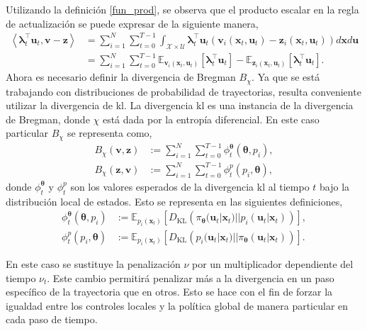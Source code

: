 Utilizando la definición \ref{fun_prod}, se observa que el producto escalar en la regla de actualización se puede expresar de la siguiente manera,
\begin{equation}
\begin{aligned}
    \left\langle\bm\lambda^{\top}_t\mathbf{u}_t, \mathbf{v}-\mathbf{z}\right\rangle &= \sum_{i=1}^{N}\sum_{t=0}^{T-1}\int_{\mathcal{X}\times\mathcal{U}}\bm\lambda_{t}^{\top}\mathbf{u}_t \left(\mathbf{v}_{i}(\mathbf{x}_t, \mathbf{u}_t)-\mathbf{z}_{i}(\mathbf{x}_t, \mathbf{u}_t)\right)d\mathbf{x}d\mathbf{u} \\
    &= \sum_{i=1}^{N}\sum_{t=0}^{T-1}\mathbb{E}_{\mathbf{v}_i(\mathbf{x}_t, \mathbf{u}_t)}\left[\bm\lambda_{t}^{\top}\mathbf{u}_t\right] - \mathbb{E}_{\mathbf{z}_i(\mathbf{x}_t, \mathbf{u}_t)}\left[\bm\lambda_{t}^{\top}\mathbf{u}_t\right].
\end{aligned}
\end{equation}
Ahora es necesario definir la divergencia de Bregman $B_{\chi}$. Ya que se está trabajando con 
distribuciones de probabilidad de trayectorias, resulta conveniente utilizar la divergencia de \acrfull{kl}. La divergencia \acrshort{kl} es una instancia de la divergencia de Bregman, donde $\chi$ está dada por la entropía diferencial. En este caso particular $B_{\chi}$ se representa como, 
\begin{align}
    B_{\chi}(\mathbf{v}, \mathbf{z}) &:=\sum_{i=1}^{N}\sum_{t=0}^{T-1} \phi_{t}^{\bm\theta}\left(\bm\theta, p_{i}\right), \\
    B_{\chi}(\mathbf{z}, \mathbf{v})  &:=  
    \sum_{i=1}^{N}\sum_{t=0}^{T-1} \phi_{t}^{p}\left(p_{i}, \bm\theta\right), 
\end{align}
donde $\phi_t^{\bm\theta}$ y $\phi_{t}^{p}$ son los valores esperados de la divergencia \acrshort{kl} al tiempo $t$ bajo la distribución local de estados. Esto se representa en las siguientes definiciones, 
\begin{align}
    \phi_t^{\bm\theta}\left(\bm\theta, p_i\right) &:= 
    \mathbb{E}_{p_i(\mathbf{x}_t)}\left[ D_{\text{KL}}\left(\pi_{\bm\theta}(\mathbf{u}_t|\mathbf{x}_t)|| p_i(\mathbf{u}_t|\mathbf{x}_t)\right)\right], \\
    \phi_t^{p}\left(p_i, \bm\theta\right) &:= 
    \mathbb{E}_{p_i(\mathbf{x}_t)}\left[ D_{\text{KL}}\left(
    p_i(\mathbf{u}_t|\mathbf{x}_t)|| \pi_{\bm\theta}(\mathbf{u}_t|\mathbf{x}_t)\right)\right].
\end{align}

En este caso se sustituye la penalización $\nu$ por un multiplicador dependiente del tiempo $\nu_t$. Este cambio permitirá penalizar más a la divergencia en un paso específico de la trayectoria que en otros. Esto se hace con el fin de forzar la igualdad entre los controles locales y la política global de manera particular en cada paso de tiempo. \cite{Deep_Visuomotor_Policies}

